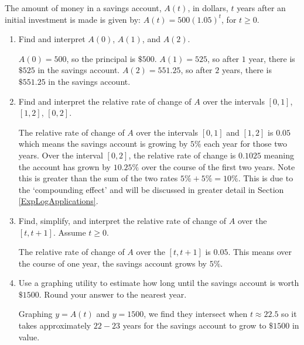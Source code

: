 \documentclass{ximera}
\begin{document}
\begin{problem}\label{preludetocompoundingexercise}

The amount of money in a savings account, $A(t)$, in dollars,  $t$ years after an initial investment is made is given by: $A(t) = 500(1.05)^{t}$, for $t \geq 0$.

\begin{enumerate}

\item  Find and interpret $A(0)$, $A(1)$, and $A(2)$. 

\begin{solution}
$A(0) = 500$, so the principal is $\$500$.  $A(1) = 525$, so after $1$ year, there is $\$525$ in the savings account.   $A(2) =551.25$, so after $2$ years, there is $\$551.25$ in the savings account. 
\end{solution}

\item  Find and interpret the relative rate of change of $A$ over the intervals $[0,1]$, $[1,2]$, $[0,2]$.

\begin{solution}
The relative rate of change of $A$ over the intervals $[0,1]$ and $[1,2]$ is $0.05$ which means the savings account is growing by $5 \%$ each year for those two years.  Over the interval $[0,2]$, the relative rate of change is $0.1025$ meaning the account has grown by $10.25 \%$ over the course of the first two years.  Note this is greater than the sum of the two rates $5 \% + 5 \% = 10 \%$.  This is due to the `compounding effect' and will be discussed in greater detail in Section \ref{ExpLogApplications}.
\end{solution}

\item  Find, simplify, and interpret the relative rate of change of $A$ over the $[t, t+1]$.  Assume  $t \geq 0$.

\begin{solution}
The relative rate of change of $A$ over the $[t, t+1]$ is $0.05$. This means over the course of one year, the savings account grows by $5 \%$.
\end{solution}

\item Use a graphing utility to estimate how long until the savings account is worth $\$1500$.  Round your answer to the nearest year.

\begin{solution}
Graphing $y= A(t)$ and $y = 1500$, we find they intersect when $t \approx 22.5$ so it takes approximately $22-23$ years for the savings account to grow to $\$1500$ in value.
\end{solution}

\end{enumerate}
  
\end{problem} 
\end{document}
